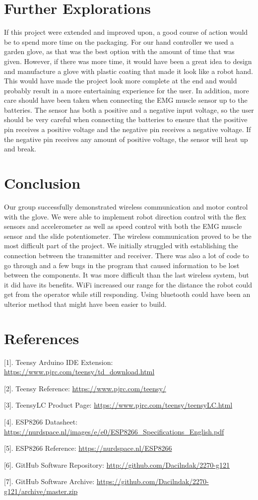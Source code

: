 \documentclass[12pt,scrartcl,titlepage]{article}
\begin{document}
\section{Further Explorations}

If this project were extended and improved upon, a good course of action would be to spend more time on the packaging. For our hand controller we used a garden glove, as that was the best option with the amount of time that was given. However, if there was more time, it would have been a great idea to design and manufacture a glove with plastic coating that made it look like a robot hand. This would have made the project look more complete at the end and would probably result in a more entertaining experience for the user. In addition, more care should have been taken when connecting the EMG muscle sensor up to the batteries. The sensor has both a positive and a negative input voltage, so the user should be very careful when connecting the batteries to ensure that the positive pin receives a positive voltage and the negative pin receives a negative voltage. If the negative pin receives any amount of positive voltage, the sensor will heat up and break.

\section{Conclusion}

Our group successfully demonstrated wireless communication and motor control with the  glove. We were able to implement robot direction control with the flex sensors and accelerometer as well as speed control with both the EMG muscle sensor and the slide potentiometer. The wireless communication proved to be the most difficult part of the project. We initially struggled with establishing the connection between the transmitter and receiver. There was also a lot of code to go through and a few bugs in the program that caused information to be lost between the components. It was more difficult than the last wireless system, but it did have its benefits. WiFi increased our range for the distance the robot could get from the operator while still responding. Using bluetooth could have been an ulterior method that might have been easier to build.

\section{References}

[1]. Teensy Arduino IDE Extension: \url{https://www.pjrc.com/teensy/td_download.html}

[2]. Teensy Reference: \url{https://www.pjrc.com/teensy/}

[3]. TeensyLC Product Page: \url{https://www.pjrc.com/teensy/teensyLC.html}

[4]. ESP8266 Datasheet: \url{https://nurdspace.nl/images/e/e0/ESP8266_Specifications_English.pdf}

[5]. ESP8266 Reference: \url{https://nurdspace.nl/ESP8266}

[6]. GitHub Software Repository: \url{http://github.com/Dacilndak/2270-g121}

[7]. GitHub Software Archive: \url{https://github.com/Dacilndak/2270-g121/archive/master.zip}
\end{document}

